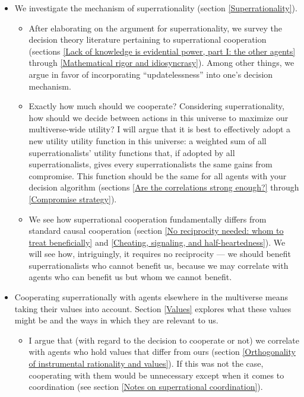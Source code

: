 \documentclass{book}
\begin{document}
\begin{itemize}
	\item We investigate the mechanism of superrationality (section \ref{Superrationality}).
	\begin{itemize}
		\item After elaborating on the argument for superrationality, we survey the decision theory literature pertaining to superrational cooperation (sections \ref{Lack of knowledge is evidential power, part I: the other agents} through \ref{Mathematical rigor and idiosyncrasy}). Among other things, we argue in favor of incorporating \enquote{updatelessness} into one’s decision mechanism.
		\item Exactly how much should we cooperate? Considering superrationality, how should we decide between actions in this universe to maximize our multiverse-wide utility? I will argue that it is best to effectively adopt a new utility utility function in this universe: a weighted sum of all superrationalists’ utility functions that, if adopted by all superrationalists, gives every superrationalists the same gains from compromise. This function should be the same for all agents with your decision algorithm (sections \ref{Are the correlations strong enough?} through \ref{Compromise strategy}).
    	\item We see how superrational cooperation fundamentally differs from standard causal cooperation (section \ref{No reciprocity needed: whom to treat beneficially} and \ref{Cheating, signaling, and half-heartedness}). We will see how, intriguingly, it requires no reciprocity --- we should benefit superrationalists who cannot benefit us, because we may correlate with agents who can benefit us but whom we cannot benefit. %
	\end{itemize}
	\item Cooperating superrationally with agents elsewhere in the multiverse means taking their values into account. Section \ref{Values} explores what these values might be and the ways in which they are relevant to us.
    \begin{itemize}
    	\item I argue that (with regard to the decision to cooperate or not) we correlate with agents who hold values that differ from ours (section \ref{Orthogonality of instrumental rationality and values}). If this was not the case, cooperating with them would be unnecessary except when it comes to coordination (see section \ref{Notes on superrational coordination}).

\end{itemize}
\end{itemize}
\end{document}

